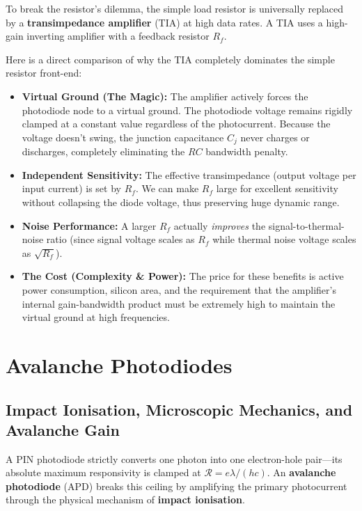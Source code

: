 To break the resistor's dilemma, the simple load resistor is universally replaced by a \textbf{transimpedance amplifier} (TIA) at high data rates. A TIA uses a high-gain inverting amplifier with a feedback resistor $R_f$.

Here is a direct comparison of why the TIA completely dominates the simple resistor front-end:
\begin{itemize}
    \item \textbf{Virtual Ground (The Magic):} The amplifier actively forces the photodiode node to a virtual ground. The photodiode voltage remains rigidly clamped at a constant value regardless of the photocurrent. Because the voltage doesn't swing, the junction capacitance $C_j$ never charges or discharges, completely eliminating the $RC$ bandwidth penalty.
    \item \textbf{Independent Sensitivity:} The effective transimpedance (output voltage per input current) is set by $R_f$. We can make $R_f$ large for excellent sensitivity without collapsing the diode voltage, thus preserving huge dynamic range.
    \item \textbf{Noise Performance:} A larger $R_f$ actually \emph{improves} the signal-to-thermal-noise ratio (since signal voltage scales as $R_f$ while thermal noise voltage scales as $\sqrt{R_f}$).
    \item \textbf{The Cost (Complexity \& Power):} The price for these benefits is active power consumption, silicon area, and the requirement that the amplifier's internal gain-bandwidth product must be extremely high to maintain the virtual ground at high frequencies.
\end{itemize}

\section{Avalanche Photodiodes}

\subsection{Impact Ionisation, Microscopic Mechanics, and Avalanche Gain}

A PIN photodiode strictly converts one photon into one electron-hole pair—its absolute maximum responsivity is clamped at $\mathcal{R} = e\lambda/(hc)$. An \textbf{avalanche photodiode} (APD) breaks this ceiling by amplifying the primary photocurrent through the physical mechanism of \textbf{impact ionisation}.

